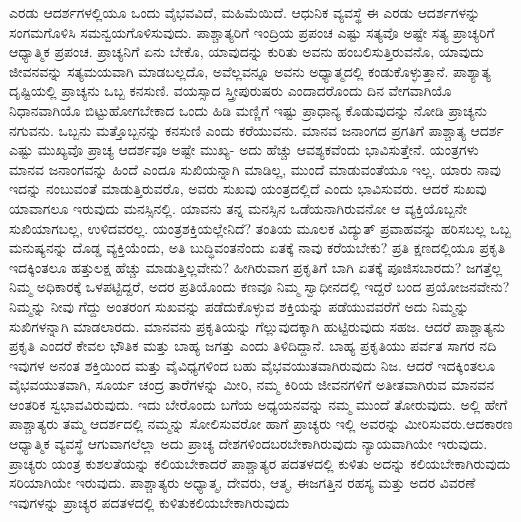 ಎರಡು ಆದರ್ಶಗಳಲ್ಲಿಯೂ ಒಂದು ವೈಭವವಿದೆ, ಮಹಿಮೆಯಿದೆ. ಆಧುನಿಕ ವ್ಯವಸ್ಥೆ ಈ ಎರಡು ಆದರ್ಶಗಳನ್ನು ಸಂಗಮಗೊಳಿಸಿ ಸಮನ್ವಯಗೊಳಿಸುವುದು. ಪಾಶ್ಚಾತ್ಯರಿಗೆ ಇಂದ್ರಿಯ ಪ್ರಪಂಚ ಎಷ್ಟು ಸತ್ಯವೊ ಅಷ್ಟೇ ಸತ್ಯ ಪ್ರಾಚ್ಯರಿಗೆ ಆಧ್ಯಾತ್ಮಿಕ ಪ್ರಪಂಚ. ಪ್ರಾಚ್ಯನಿಗೆ ಏನು ಬೇಕೊ, ಯಾವುದನ್ನು ಕುರಿತು ಅವನು ಹಂಬಲಿಸುತ್ತಿರುವನೊ, ಯಾವುದು ಜೀವನವನ್ನು ಸತ್ಯಮಯವಾಗಿ ಮಾಡಬಲ್ಲದೊ, ಅವೆಲ್ಲವನ್ನೂ ಅವನು ಅಧ್ಯಾತ್ಮದಲ್ಲಿ ಕಂಡುಕೊಳ್ಳುತ್ತಾನೆ. ಪಾಶ್ಯಾತ್ಯ ದೃಷ್ಟಿಯಲ್ಲಿ ಪ್ರಾಚ್ಯನು ಒಬ್ಬ ಕನಸುಣಿ. ವಯಸ್ಸಾದ ಸ್ತ್ರೀಪುರುಷರು ಎಂದಾದರೊಂದು ದಿನ ವೇಗವಾಗಿಯೊ ನಿಧಾನವಾಗಿಯೊ ಬಿಟ್ಟುಹೋಗಬೇಕಾದ ಒಂದು ಹಿಡಿ ಮಣ್ಣಿಗೆ ಇಷ್ಟು ಪ್ರಾಧಾನ್ಯ ಕೊಡುವುದನ್ನು ನೋಡಿ ಪ್ರಾಚ್ಯನು ನಗುವನು. ಒಬ್ಬನು ಮತ್ತೊಬ್ಬನನ್ನು ಕನಸುಣಿ ಎಂದು ಕರೆಯುವನು. ಮಾನವ ಜನಾಂಗದ ಪ್ರಗತಿಗೆ ಪಾಶ್ಚಾತ್ಯ ಆದರ್ಶ ಎಷ್ಟು ಮುಖ್ಯವೊ ಪ್ರಾಚ್ಯ ಆದರ್ಶವೂ ಅಷ್ಟೇ ಮುಖ್ಯ- ಅದು ಹೆಚ್ಚು ಆವಶ್ಯಕವೆಂದು ಭಾವಿಸುತ್ತೇನೆ. ಯಂತ್ರಗಳು ಮಾನವ ಜನಾಂಗವನ್ನು ಹಿಂದೆ ಎಂದೂ ಸುಖಿಯನ್ನಾಗಿ ಮಾಡಿಲ್ಲ, ಮುಂದೆ ಮಾಡುವಂತೆಯೂ ಇಲ್ಲ. ಯಾರು ನಾವು ಇದನ್ನು ನಂಬುವಂತೆ ಮಾಡುತ್ತಿರುವರೊ, ಅವರು ಸುಖವು ಯಂತ್ರದಲ್ಲಿದೆ ಎಂದು ಭಾವಿಸುವರು. ಆದರೆ ಸುಖವು ಯಾವಾಗಲೂ ಇರುವುದು ಮನಸ್ಸಿನಲ್ಲಿ. ಯಾವನು ತನ್ನ ಮನಸ್ಸಿನ ಒಡೆಯನಾಗಿರುವನೋ ಆ ವ್ಯಕ್ತಿಯೊಬ್ಬನೇ ಸುಖಿಯಾಗಬಲ್ಲ, ಉಳಿದವರಲ್ಲ. ಯಂತ್ರಶಕ್ತಿಯಲ್ಲೇನಿದೆ? ತಂತಿಯ ಮೂಲಕ ವಿದ್ಯುತ್​ ಪ್ರವಾಹವನ್ನು ಹರಿಸಬಲ್ಲ ಒಬ್ಬ ಮನುಷ್ಯನನ್ನು ದೊಡ್ಡ ವ್ಯಕ್ತಿಯೆಂದು, ಅತಿ ಬುದ್ಧಿವಂತನೆಂದು ಏತಕ್ಕೆ ನಾವು ಕರೆಯಬೇಕು? ಪ್ರತಿ ಕ್ಷಣದಲ್ಲಿಯೂ ಪ್ರಕೃತಿ ಇದಕ್ಕಿಂತಲೂ ಹತ್ತುಲಕ್ಷ ಹೆಚ್ಚು ಮಾಡುತ್ತಿಲ್ಲವೇನು? ಹೀಗಿರುವಾಗ ಪ್ರಕೃತಿಗೆ ಬಾಗಿ ಏತಕ್ಕೆ ಪೂಜಿಸಬಾರದು? ಜಗತ್ತೆಲ್ಲ ನಿಮ್ಮ ಅಧಿಕಾರಕ್ಕೆ ಒಳಪಟ್ಟಿದ್ದರೆ, ಅದರ ಪ್ರತಿಯೊಂದು ಕಣವೂ ನಿಮ್ಮ ಸ್ವಾಧೀನದಲ್ಲಿ ಇದ್ದರೆ ಬಂದ ಪ್ರಯೋಜನವೇನು? ನಿಮ್ಮನ್ನು ನೀವು ಗೆದ್ದು ಅಂತರಂಗ ಸುಖವನ್ನು ಪಡೆದುಕೊಳ್ಳುವ ಶಕ್ತಿಯನ್ನು ಪಡೆಯುವವರೆಗೆ ಅದು ನಿಮ್ಮನ್ನು ಸುಖಿಗಳನ್ನಾಗಿ ಮಾಡಲಾರದು. ಮಾನವನು ಪ್ರಕೃತಿಯನ್ನು ಗೆಲ್ಲುವುದಕ್ಕಾಗಿ ಹುಟ್ಟಿರುವುದು ಸಹಜ. ಆದರೆ ಪಾಶ್ಚಾತ್ಯನು ಪ್ರಕೃತಿ ಎಂದರೆ ಕೇವಲ ಭೌತಿಕ ಮತ್ತು ಬಾಹ್ಯ ಜಗತ್ತು ಎಂದು ತಿಳಿದಿದ್ದಾನೆ. ಬಾಹ್ಯ ಪ್ರಕೃತಿಯು ಪರ್ವತ ಸಾಗರ ನದಿ ಇವುಗಳ ಅನಂತ ಶಕ್ತಿಯಿಂದ ಮತ್ತು ವೈವಿಧ್ಯಗಳಿಂದ ಬಹು ವೈಭವಯುತವಾಗಿರುವುದು ನಿಜ. ಆದರೆ ಇದಕ್ಕಿಂತಲೂ ವೈಭವಯುತವಾಗಿ, ಸೂರ್ಯ ಚಂದ್ರ ತಾರೆಗಳನ್ನು ಮೀರಿ, ನಮ್ಮ ಕಿರಿಯ ಜೀವನಗಳಿಗೆ ಅತೀತವಾಗಿರುವ ಮಾನವನ ಆಂತರಿಕ ಸ್ವಭಾವವಿರುವುದು. ಇದು ಬೇರೊಂದು ಬಗೆಯ ಅಧ್ಯಯನವನ್ನು ನಮ್ಮ ಮುಂದೆ ತೋರುವುದು. ಅಲ್ಲಿ ಹೇಗೆ ಪಾಶ್ಚಾತ್ಯರು ತಮ್ಮ ಆದರ್ಶದಲ್ಲಿ ನಮ್ಮನ್ನು ಸೋಲಿಸುವರೋ ಹಾಗೆ ಪ್ರಾಚ್ಯರು ಇಲ್ಲಿ ಅವರನ್ನು ಮೀರಿಸುವರು.\break ಆದಕಾರಣ ಆಧ್ಯಾತ್ಮಿಕ ವ್ಯವಸ್ಥೆ ಆಗುವಾಗಲೆಲ್ಲಾ ಅದು ಪ್ರಾಚ್ಯ ದೇಶಗಳಿಂದ\break ಬರಬೇಕಾಗಿರುವುದು ನ್ಯಾಯವಾಗಿಯೇ ಇರುವುದು. ಪ್ರಾಚ್ಯರು ಯಂತ್ರ ಕುಶಲತೆಯನ್ನು ಕಲಿಯಬೇಕಾದರೆ ಪಾಶ್ಚಾತ್ಯರ ಪದತಳದಲ್ಲಿ ಕುಳಿತು ಅದನ್ನು ಕಲಿಯಬೇಕಾ\-ಗಿರುವುದು ಸರಿಯಾಗಿಯೇ ಇರುವುದು. ಪಾಶ್ಚಾತ್ಯರು ಅಧ್ಯಾತ್ಮ, ದೇವರು, ಆತ್ಮ, ಈ\break ಜಗತ್ತಿನ ರಹಸ್ಯ ಮತ್ತು ಅದರ ವಿವರಣೆ ಇವುಗಳನ್ನು ಪ್ರಾಚ್ಯರ ಪದತಳದಲ್ಲಿ ಕುಳಿತು\break ಕಲಿಯಬೇಕಾಗಿರುವುದು

